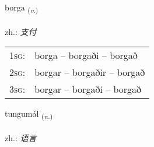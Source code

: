 \documentclass[frontgrid, backgrid]{flacards}\usepackage[]{graphicx}\usepackage[]{xcolor}
\begin{document}
\renewcommand{\flhead}{\vskip5pt \fboxsep=0pt {\small\bfseries\footnotesize Sagnorð | 动词}}
\renewcommand{\fcfoot}{\vskip5pt \fboxsep=0pt \hspace{2pt}{\small\bfseries\footnotesize 1K}}

\renewcommand{\blhead}{\vskip5pt {\small\bfseries\footnotesize Sagnorð | 动词 }}
\renewcommand{\bcfoot}{\vskip5pt \hspace{2pt}{\small\bfseries\footnotesize 1K}}


{borga \small{\textsubscript{(\textit{v.})}} \\[1ex] %
\textphonetic{[pɔrka]} \\
zh.: \emph{支付} \\  [2ex]
\renewcommand*{\arraystretch}{0.8}
\begin{tabular}{p{1cm}l}
\textsc{1sg}: & borga -- borgaði -- borgað \\ 
\textsc{2sg}: & borgar -- borgaðir -- borgað \\ 
\textsc{3sg}: & borgar -- borgaði -- borgað \\ 
\end{tabular}
}

\renewcommand{\flhead}{\vskip5pt \fboxsep=0pt {\small\bfseries\footnotesize Nafnorð | 名词}}
\renewcommand{\fcfoot}{\vskip5pt \fboxsep=0pt \hspace{2pt}{\small\bfseries\footnotesize 1K}}

\renewcommand{\blhead}{\vskip5pt {\small\bfseries\footnotesize Nafnorð | 名词 }}
\renewcommand{\bcfoot}{\vskip5pt \hspace{2pt}{\small\bfseries\footnotesize 1K}}


{tungumál \small{\textsubscript{(\textit{n.})}} \\[1ex] %
\textphonetic{[tʰuŋkʏmaul]} \\
zh.: \emph{语言} \\  [2ex]
\renewcommand*{\arraystretch}{0.8}
}
\end{document}
